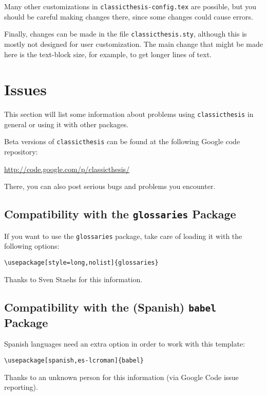 Many other customizations in \texttt{classicthesis-config.tex} are possible, but you should be careful making changes there, since some changes could cause errors.

Finally, changes can be made in the file \texttt{classicthesis.sty},  although this is mostly not designed for user customization. The main change that might be made here is the text-block size, for example, to get longer lines of text.


\section{Issues}\label{sec:issues}
This section will list some information about problems using \texttt{classic\-thesis} in general or using it with other packages.

Beta versions of \texttt{classicthesis} can be found at the following Google code repository:
\begin{center}
\url{http://code.google.com/p/classicthesis/}
\end{center}

\noindent There, you can also post serious bugs and problems you encounter.

\subsection*{Compatibility with the \texttt{glossaries} Package}
If you want to use the \texttt{glossaries} package, take care of loading it with the following options:
\begin{verbatim}
\usepackage[style=long,nolist]{glossaries}
\end{verbatim}

\noindent Thanks to Sven Staehs for this information. 

\subsection*{Compatibility with the (Spanish) \texttt{babel} Package}
Spanish languages need an extra option in order to work with this template:
\begin{verbatim}
\usepackage[spanish,es-lcroman]{babel}
\end{verbatim}

\noindent Thanks to an unknown person for this information (via Google Code issue reporting). 

